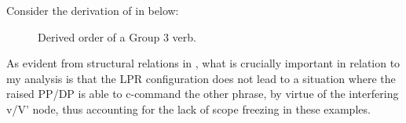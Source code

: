 \documentclass[output=paper,colorlinks,citecolor=brown,modfonts,nonflat]{langsci/langscibook}
\begin{document}
Consider the derivation of  in  below:

\begin{figure}
\caption{Derived order of a Group 3 verb.}
\label{fig:antonyuk:4}
\end{figure}

As evident from structural relations in , what is crucially important in relation to my analysis is that the LPR configuration does not lead to a situation where the raised PP/DP is able to c-command the other phrase, by virtue of the interfering v/V' node, thus accounting for the lack of scope freezing in these examples.
\end{document}
